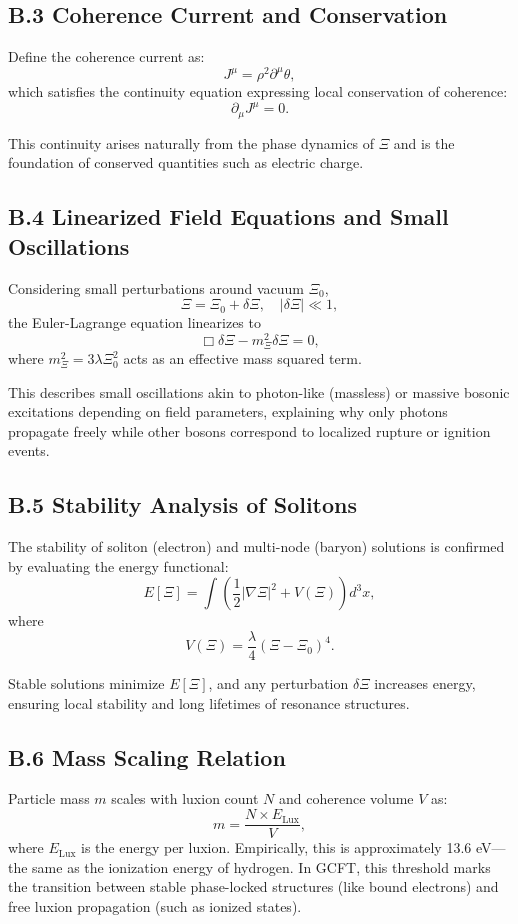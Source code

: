 \subsection*{B.3 Coherence Current and Conservation}

Define the coherence current as:
\[
J^\mu = \rho^2 \partial^\mu \theta,
\]
which satisfies the continuity equation expressing local conservation of coherence:
\[
\partial_\mu J^\mu = 0.
\]

This continuity arises naturally from the phase dynamics of $\Xi$ and is the foundation of conserved quantities such as electric charge.

\subsection*{B.4 Linearized Field Equations and Small Oscillations}

Considering small perturbations around vacuum $\Xi_0$,
\[
\Xi = \Xi_0 + \delta \Xi, \quad |\delta \Xi| \ll 1,
\]
the Euler-Lagrange equation linearizes to
\[
\Box \delta \Xi - m_\Xi^2 \delta \Xi = 0,
\]
where $m_\Xi^2 = 3 \lambda \Xi_0^2$ acts as an effective mass squared term.

This describes small oscillations akin to photon-like (massless) or massive bosonic excitations depending on field parameters, explaining why only photons propagate freely while other bosons correspond to localized rupture or ignition events.

\subsection*{B.5 Stability Analysis of Solitons}

The stability of soliton (electron) and multi-node (baryon) solutions is confirmed by evaluating the energy functional:
\[
E[\Xi] = \int \left( \frac{1}{2} |\nabla \Xi|^2 + V(\Xi) \right) d^3x,
\]
where
\[
V(\Xi) = \frac{\lambda}{4} (\Xi - \Xi_0)^4.
\]

Stable solutions minimize $E[\Xi]$, and any perturbation $\delta \Xi$ increases energy, ensuring local stability and long lifetimes of resonance structures.

\subsection*{B.6 Mass Scaling Relation}

Particle mass $m$ scales with luxion count $N$ and coherence volume $V$ as:
\[
m = \frac{N \times E_{\text{Lux}}}{V},
\]
where $E_{\text{Lux}}$ is the energy per luxion. Empirically, this is approximately 13.6 eV—the same as the ionization energy of hydrogen. In GCFT, this threshold marks the transition between stable phase-locked structures (like bound electrons) and free luxion propagation (such as ionized states).

